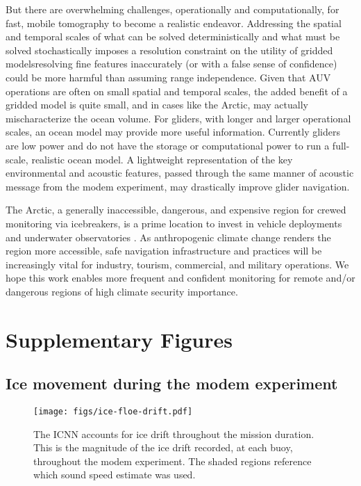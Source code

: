 But there are overwhelming challenges, operationally and computationally, for fast, mobile tomography to become a realistic endeavor.
Addressing the spatial and temporal scales of what can be solved deterministically and what must be solved stochastically imposes a resolution constraint on the utility of gridded models\textemdash resolving fine features inaccurately (or with a false sense of confidence) could be more harmful than assuming range independence.
Given that AUV operations are often on small spatial and temporal scales, the added benefit of a gridded model is quite small, and in cases like the Arctic, may actually mischaracterize the ocean volume. 
For gliders, with longer and larger operational scales, an ocean model may provide more useful information.
Currently gliders are low power and do not have the storage or computational power to run a full-scale, realistic ocean model.
A lightweight representation of the key environmental and acoustic features, passed through the same manner of acoustic message from the modem experiment, may drastically improve glider navigation.

The Arctic, a generally inaccessible, dangerous, and expensive region for crewed monitoring via icebreakers,  is a prime location to invest in vehicle deployments and underwater observatories \citep{mikhalevsky_multipurpose_2015}.
As anthropogenic climate change renders the region more accessible, safe navigation infrastructure and practices will be increasingly vital for industry, tourism, commercial, and military operations.
We hope this work enables more frequent and confident monitoring for remote and/or dangerous regions of high climate security importance.

\clearpage
\section*{Supplementary Figures}

\subsection*{Ice movement during the modem experiment}
\begin{figure}[h!]
\texttt{[image: figs/ice-floe-drift.pdf]}
\caption{\label{fig:iceFloeDrift}{The ICNN accounts for ice drift throughout the mission duration. This is the magnitude of the ice drift recorded, at each buoy, throughout the modem experiment. The shaded regions reference which sound speed estimate was used.}}
\end{figure}

